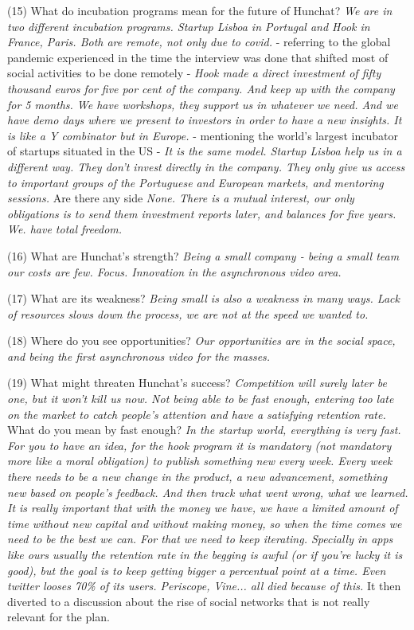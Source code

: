 \documentclass[12pt]{article}
\begin{document}
(15) What do incubation programs mean for the future of Hunchat? \textit{We are in two different incubation programs. Startup Lisboa in Portugal and Hook in France, Paris. Both are remote, not only due to covid.} - referring to the global pandemic experienced in the time the interview was done that shifted most of social activities to be done remotely - \textit{Hook made a direct investment of fifty thousand euros for five por cent of the company. And keep up with the company for 5 months. We have workshops, they support us in whatever we need. And we have demo days where we present to investors in order to have a new insights. It is like a Y combinator but in Europe.} - mentioning the world's largest incubator of startups situated in the US -\textit{ It is the same model. Startup Lisboa help us in a different way. They don't invest directly in the company. They only give us access to important groups of the Portuguese and European markets, and mentoring sessions.} Are there any side \textit{None. There is a mutual interest, our only obligations is to send them investment reports later, and balances for five years. We. have total freedom.}

(16) What are Hunchat’s strength? \textit{Being a small company - being a small team our costs are few. Focus. Innovation in the asynchronous video area.}

(17) What are its weakness? \textit{Being small is also a weakness in many ways. Lack of resources slows down the process, we are not at the speed we wanted to.}

(18) Where do you see opportunities? \textit{Our opportunities are in the social space, and being the first asynchronous video for the masses.}

(19) What might threaten Hunchat’s success? \textit{Competition will surely later be one, but it won't kill us now. Not being able to be fast enough, entering too late on the market to catch people's attention and have a satisfying retention rate.} What do you mean by fast enough? \textit{In the startup world, everything is very fast. For you to have an idea, for the hook program it is mandatory (not mandatory more like a moral obligation) to publish something new every week. Every week there needs to be a new change in the product, a new advancement, something new based on people's feedback. And then track what went wrong, what we learned. It is really important that with the money we have, we have a limited amount of time without new capital and without making money, so when the time comes we need to be the best we can. For that we need to keep iterating. Specially in apps like ours usually the retention rate in the begging is awful (or if you're lucky it is good), but the goal is to keep getting bigger a percentual point at a time. Even twitter looses 70\% of its users. Periscope, Vine... all died because of this.} It then diverted to a discussion about the rise of social networks that is not really relevant for the plan.
\end{document}
